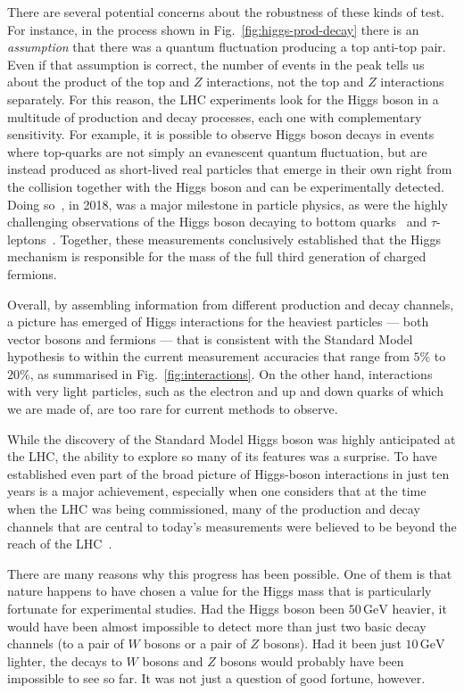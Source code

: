 \documentclass{article}
\newcommand{\GeV}{\,\text{GeV}}
\begin{document}
There are several potential concerns about the robustness of these
kinds of test.
%
For instance, in the process shown in Fig.~\ref{fig:higgs-prod-decay}
there is an \emph{assumption} that there was a quantum fluctuation
producing a top anti-top pair.
%
Even if that assumption is correct, the number of events in the peak
tells us about the product of the top and $Z$ interactions, not the
top and $Z$ interactions separately.
%
For this reason, the LHC experiments look for the Higgs boson in a
multitude of production and decay processes, each one with
complementary sensitivity.
%
For example, it is possible to observe Higgs boson decays in events
where top-quarks are not simply an evanescent quantum fluctuation, but
are instead produced as short-lived real particles that emerge in
their own right from the collision together with the Higgs boson and
can be experimentally detected. 
%
Doing so~\cite{ATLAS:2018mme,CMS:2018uxb}, in 2018, was a major
milestone in particle physics, as were
%
the highly challenging observations of the Higgs boson decaying
  to bottom
quarks~\cite{ATLAS:2020fcp,CMS:2018nsn} and
$\tau$-leptons~\cite{ATLAS:2022yrq,CMS:2021gxc}.
%
Together, these measurements conclusively established that the Higgs
mechanism is responsible for the mass of the full third generation of
charged fermions.
%

Overall, by assembling information from different production and decay
channels, a picture has emerged of Higgs interactions for the heaviest
particles --- both vector bosons and fermions --- that is consistent
with the Standard Model hypothesis to within the current measurement
accuracies that range from $5\%$ to $20\%$, as summarised in
Fig.~\ref{fig:interactions}.
%
On the other hand, interactions with very light particles, such as the
electron and up and down quarks of which we are made of, are too rare for
current methods to observe.

While the discovery of the Standard Model Higgs boson was
highly anticipated
at the LHC, the ability to explore so many of its features was
a surprise.
%
To have established even part of the broad picture of Higgs-boson
interactions in just ten years is a major achievement, especially when
one considers that at the time when the LHC was being commissioned, many
of the production and decay channels that are central to
today's measurements were believed to be beyond the reach of the
LHC~\cite{CMS:2007sch,ATLAS:2009zsq}.

There are many reasons why this progress has been possible.
%
One of them is that nature happens to have chosen a value for
the Higgs mass that is particularly fortunate for experimental
studies.
% 
Had the Higgs boson been $50 \GeV$ heavier, it would have been almost
impossible to detect more than just two basic decay channels (to a
pair of $W$ bosons or a pair of $Z$ bosons).
%
Had it been just $10\GeV$ lighter, the decays to $W$ bosons and $Z$ bosons
would probably have been impossible to see so far.
It was not just a question of good fortune, however.
\end{document}
